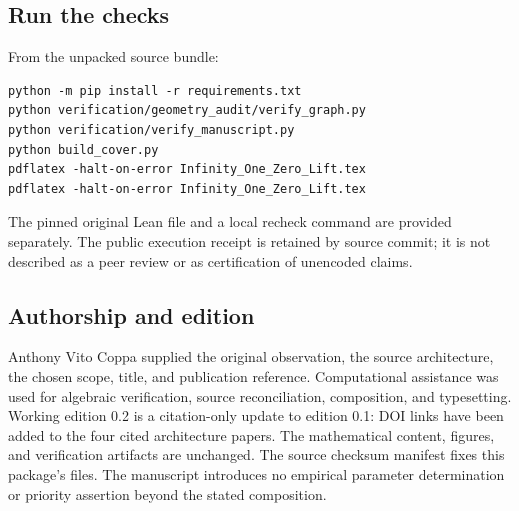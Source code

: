 \documentclass[11pt]{article}
\theoremstyle{definition}\newtheorem{definition}[theorem]{Definition}
\begin{document}
\subsection*{Run the checks}
From the unpacked source bundle:
\begin{verbatim}
python -m pip install -r requirements.txt
python verification/geometry_audit/verify_graph.py
python verification/verify_manuscript.py
python build_cover.py
pdflatex -halt-on-error Infinity_One_Zero_Lift.tex
pdflatex -halt-on-error Infinity_One_Zero_Lift.tex
\end{verbatim}
The pinned original Lean file and a local recheck command are provided separately. The public execution receipt is retained by source commit; it is not described as a peer review or as certification of unencoded claims.

\subsection*{Authorship and edition}
Anthony Vito Coppa supplied the original observation, the source architecture, the chosen scope, title, and publication reference. Computational assistance was used for algebraic verification, source reconciliation, composition, and typesetting. Working edition 0.2 is a citation-only update to edition 0.1: DOI links have been added to the four cited architecture papers. The mathematical content, figures, and verification artifacts are unchanged. The source checksum manifest fixes this package's files. The manuscript introduces no empirical parameter determination or priority assertion beyond the stated composition.
\end{document}
